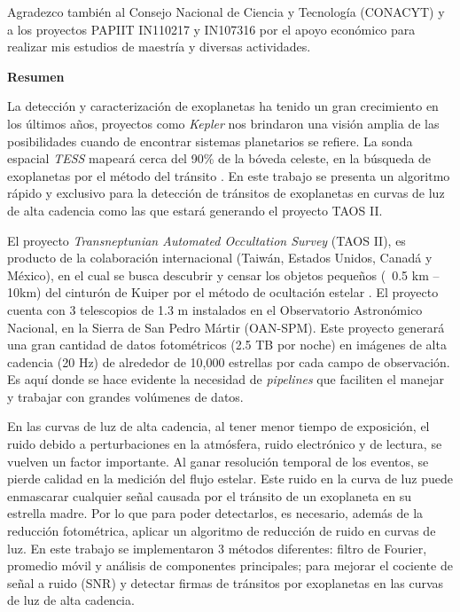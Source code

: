 Agradezco también al Consejo Nacional de Ciencia y Tecnología (CONACYT) y a los proyectos PAPIIT IN110217 y IN107316 por el apoyo económico para realizar mis estudios de maestría y diversas actividades.

\thispagestyle{plain}
\tableofcontents
\thispagestyle{plain}\thispagestyle{plain}


\thispagestyle{plain}
\listoffigures
{}
\thispagestyle{plain}\thispagestyle{plain}

\thispagestyle{plain}
\newpage

\thispagestyle{plain}
\centerline{\textbf{Resumen}}

La detección y caracterización de exoplanetas ha tenido un gran crecimiento en los últimos años, proyectos como \textit{Kepler} nos brindaron una visión amplia de las posibilidades cuando de encontrar sistemas planetarios se refiere. La sonda espacial \textit{TESS} mapeará cerca del 90\% de la bóveda celeste, en la búsqueda de exoplanetas por el método del tránsito \cite{ricker2014transiting}. En este trabajo se presenta un algoritmo rápido y exclusivo para la detección de tránsitos de exoplanetas en curvas de luz de alta cadencia como las que estará generando el proyecto TAOS II.  

El proyecto \textit{Transneptunian Automated Occultation Survey} (TAOS II), es producto de la colaboración internacional (Taiwán, Estados Unidos, Canadá y México), en el cual se busca descubrir y censar los objetos pequeños (~0.5 km – 10km) del cinturón de Kuiper por el método de ocultación estelar \cite{lehner2012transneptunian}. El proyecto cuenta con 3 telescopios de 1.3 m instalados en el Observatorio Astronómico Nacional, en la Sierra de San Pedro Mártir (OAN-SPM). Este proyecto generará una gran cantidad de datos fotométricos (2.5 TB por noche) en imágenes de alta cadencia (20 Hz) de alrededor de 10,000 estrellas por cada campo de observación. Es aquí donde se hace evidente la necesidad de \textit{pipelines} que faciliten el manejar y trabajar con grandes volúmenes de datos. 

En las curvas de luz de alta cadencia, al tener menor tiempo de exposición, el ruido debido a perturbaciones en la atmósfera, ruido electrónico y de lectura, se vuelven un factor importante. Al ganar resolución temporal de los eventos, se pierde calidad en la medición del flujo estelar. Este ruido en la curva de luz puede enmascarar cualquier señal causada por el tránsito de un exoplaneta en su estrella madre. Por lo que para poder detectarlos, es necesario, además de la reducción fotométrica, aplicar un algoritmo de reducción de ruido en curvas de luz. En este trabajo se implementaron 3 métodos diferentes: filtro de Fourier, promedio móvil y análisis de componentes principales; para mejorar el cociente de señal a ruido (SNR) y detectar firmas de tránsitos por exoplanetas en las curvas de luz de alta cadencia. 

